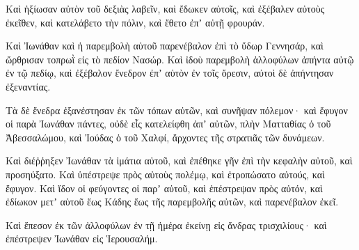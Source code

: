 {Καὶ ἠξίωσαν αὐτὸν τοῦ δεξιὰς λαβεῖν, καὶ ἔδωκεν αὐτοῖς, καὶ ἐξέβαλεν αὐτοὺς ἐκεῖθεν, καὶ κατελάβετο τὴν πόλιν, καὶ ἔθετο ἐπʼ αὐτῇ φρουράν.
\par }{\PP {}Καὶ Ἰωνάθαν καὶ ἡ παρεμβολὴ αὐτοῦ παρενέβαλον ἐπὶ τὸ ὕδωρ Γεννησάρ, καὶ ὤρθρισαν τοπρωῒ εἰς τὸ πεδίον Νασώρ.
Καὶ ἰδοὺ παρεμβολὴ ἀλλοφύλων ἀπήντα αὐτῷ ἐν τῷ πεδίῳ, καὶ ἐξέβαλον ἔνεδρον ἐπʼ αὐτὸν ἐν τοῖς ὄρεσιν, αὐτοὶ δὲ ἀπήντησαν ἐξεναντίας.
\par }{\PP {}Τὰ δὲ ἔνεδρα ἐξανέστησαν ἐκ τῶν τόπων αὐτῶν, καὶ συνῆψαν πόλεμον· καὶ ἔφυγον οἱ παρὰ Ἰωνάθαν πάντες,
οὐδὲ εἷς κατελείφθη ἀπʼ αὐτῶν, πλὴν Ματταθίας ὁ τοῦ Ἀβεσσαλώμου, καὶ Ἰούδας ὁ τοῦ Χαλφί, ἄρχοντες τῆς στρατιᾶς τῶν δυνάμεων.
\par }{\PP {}Καὶ διέῤῥηξεν Ἰωνάθαν τὰ ἱμάτια αὐτοῦ, καὶ ἐπέθηκε γῆν ἐπὶ τὴν κεφαλὴν αὐτοῦ, καὶ προσηύξατο.
Καὶ ὑπέστρεψε πρὸς αὐτοὺς πολέμῳ, καὶ ἐτροπώσατο αὐτούς, καὶ ἔφυγον.
Καὶ ἴδον οἱ φεύγοντες οἱ παρʼ αὐτοῦ, καὶ ἐπέστρεψαν πρὸς αὐτόν, καὶ ἐδίωκον μετʼ αὐτοῦ ἕως Κάδης ἕως τῆς παρεμβολῆς αὐτῶν, καὶ παρενέβαλον ἐκεῖ.
\par }{\PP {}Καὶ ἔπεσον ἐκ τῶν ἀλλοφύλων ἐν τῇ ἡμέρα ἐκείνῃ εἰς ἄνδρας τρισχιλίους· καὶ ἐπέστρεψεν Ἰωνάθαν εἰς Ἱερουσαλήμ.

}
